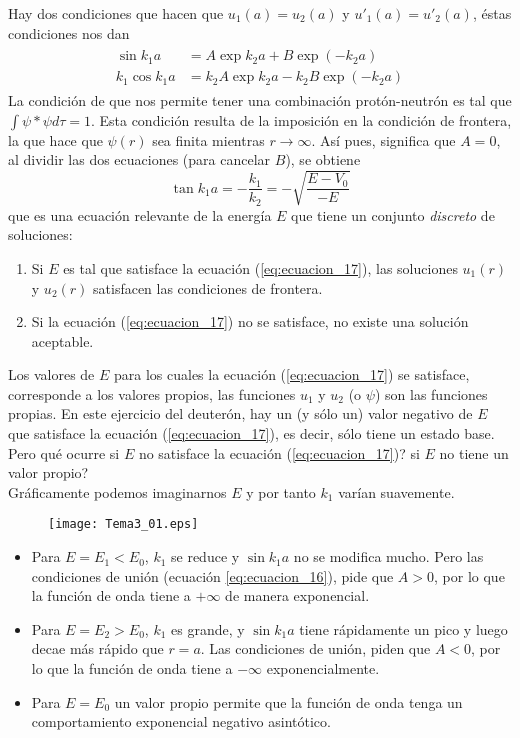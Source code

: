 Hay dos condiciones que hacen que $u_{1}(a) = u_{2}(a)$ y $u'_{1}(a) = u'_{2}(a)$, éstas condiciones nos dan
\begin{eqnarray}
\begin{aligned}
\sin k_{1} a &= A \exp	k_{2} a + B \exp(-k_{2}a) \\
k_{1} \cos k_{1} a &= k_{2} A \exp k_{2} a - k_{2} B \exp(-k_{2}a)
\label{eq:ecuacion_16}
\end{aligned}
\end{eqnarray}
La condición de que nos permite tener una combinación protón-neutrón es tal que $\int \psi* \psi d \tau = 1$. Esta condición resulta de la imposición en la condición de frontera, la que hace que $\psi(r)$ sea finita mientras $r \to \infty$. Así pues, significa que $A=0$, al dividir las dos ecuaciones (para cancelar $B$), se obtiene
\begin{equation}
\tan k_{1} a = - \dfrac{k_{1}}{k_{2}} = - \sqrt{\dfrac{E - V_{0}}{-E}} 
\label{eq:ecuacion_17}
\end{equation}
que es una ecuación relevante de la energía $E$ que tiene un conjunto \emph{discreto} de soluciones:
\begin{enumerate}
\item Si $E$ es tal que satisface la ecuación (\ref{eq:ecuacion_17}), las soluciones $u_{1}(r)$ y $u_{2}(r)$ satisfacen las condiciones de frontera.
\item Si la ecuación (\ref{eq:ecuacion_17}) no se satisface, no existe una solución aceptable.
\end{enumerate}
Los valores de $E$ para los cuales la ecuación (\ref{eq:ecuacion_17}) se satisface, corresponde a los valores propios, las funciones $u_{1}$ y $u_{2}$ (o $\psi$) son las funciones propias. En este ejercicio del deuterón, hay un (y sólo un) valor negativo de $E$ que satisface la ecuación (\ref{eq:ecuacion_17}), es decir, sólo tiene un estado base.
\\
Pero qué ocurre si $E$ no satisface la ecuación (\ref{eq:ecuacion_17})? si $E$ no tiene un valor propio?
\\
Gráficamente podemos imaginarnos $E$ y por tanto $k_{1}$ varían suavemente.
\begin{figure}[!h]
\centering
\texttt{[image: Tema3\_01.eps]} 
\end{figure}
\begin{itemize}
\item Para $E= E_{1} < E_{0}$, $k_{1}$ se reduce y $\sin k_{1}a$ no se modifica mucho. Pero las condiciones de unión (ecuación \ref{eq:ecuacion_16}), pide que $A>0$, por lo que la función de onda tiene a $+\infty$ de manera exponencial.
\item Para $E=E_{2} > E_{0}$, $k_{1}$ es grande,  y $\sin k_{1}a$ tiene rápidamente un pico y luego decae más rápido que $r=a$. Las condiciones de unión, piden que $A<0$, por lo que la función de onda tiene a $-\infty$ exponencialmente.
\item Para $E=E_{0}$ un valor propio permite que la función de onda tenga un comportamiento exponencial negativo asintótico.
\end{itemize}
